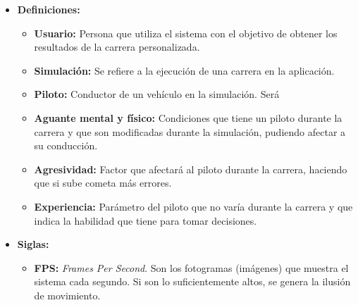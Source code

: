 \begin{itemize}
    \item \textbf{Definiciones: }
        \begin{itemize}
            \item \textbf{Usuario: }Persona que utiliza el sistema con el objetivo de obtener los resultados de la carrera personalizada.
            \item \textbf{Simulación: }Se refiere a la ejecución de una carrera en la aplicación.
            \item \textbf{Piloto: }Conductor de un vehículo en la simulación. Será 
            \item \textbf{Aguante mental y físico: }Condiciones que tiene un piloto durante la carrera y que son modificadas durante la simulación, pudiendo afectar a su conducción.
            \item \textbf{Agresividad: }Factor que afectará al piloto durante la carrera, haciendo que si sube cometa más errores.
            \item \textbf{Experiencia: }Parámetro del piloto que no varía durante la carrera y que indica la habilidad que tiene para tomar decisiones.
        \end{itemize}
    \item \textbf{Siglas: }
    \begin{itemize}
        \item \textbf{FPS: }\textit{Frames Per Second}. Son los fotogramas (imágenes) que muestra el sistema cada segundo. Si son lo suficientemente altos, se genera la ilusión de movimiento.
    \end{itemize}
\end{itemize}




